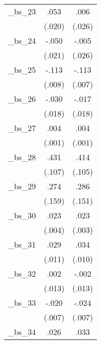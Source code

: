 {\begin{tabular}{l*{2}{c}}
\addlinespace
\_bs\_23          &         .053\sym{***}&         .006         \\
                &       (.020)         &       (.026)         \\
\addlinespace
\_bs\_24          &        -.050\sym{**} &        -.005         \\
                &       (.021)         &       (.026)         \\
\addlinespace
\_bs\_25          &        -.113\sym{***}&        -.113\sym{***}\\
                &       (.008)         &       (.007)         \\
\addlinespace
\_bs\_26          &        -.030\sym{*}  &        -.017         \\
                &       (.018)         &       (.018)         \\
\addlinespace
\_bs\_27          &         .004\sym{***}&         .004\sym{***}\\
                &       (.001)         &       (.001)         \\
\addlinespace
\_bs\_28          &         .431\sym{***}&         .414\sym{***}\\
                &       (.107)         &       (.105)         \\
\addlinespace
\_bs\_29          &         .274\sym{*}  &         .286\sym{*}  \\
                &       (.159)         &       (.151)         \\
\addlinespace
\_bs\_30          &         .023\sym{***}&         .023\sym{***}\\
                &       (.004)         &       (.003)         \\
\addlinespace
\_bs\_31          &         .029\sym{***}&         .034\sym{***}\\
                &       (.011)         &       (.010)         \\
\addlinespace
\_bs\_32          &         .002         &        -.002         \\
                &       (.013)         &       (.013)         \\
\addlinespace
\_bs\_33          &        -.020\sym{***}&        -.024\sym{***}\\
                &       (.007)         &       (.007)         \\
\addlinespace
\_bs\_34          &         .026         &         .033\sym{*}  \\

\end{tabular}}
